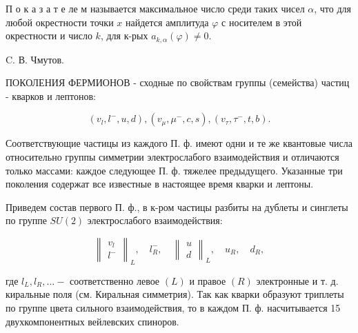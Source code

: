 \documentclass[10pt]{article}
\begin{document}
П о к а з а т е ле м называется максимальное число среди таких чисел $\alpha$, что для любой окрестности точки $x$ найдется амплитуда $\varphi$ с носителем в этой окрестности и число $k$, для к-рых $a_{k, \alpha}(\varphi) \neq 0$.



C. В. Чмутов.



ПОКОЛЕНИЯ ФЕРМИОНОВ - сходные по свойствам группы (семейства) частиц - кварков и лептонов:



\[

\left(v_{l}, l^{-}, u, d\right),\left(v_{\mu}, \mu^{-}, c, s\right),\left(v_{\tau}, \tau^{-}, t, b\right) .

\]



Соответствующие частицы из каждого П. ф. имеют одни и те же квантовые числа относительно группы симметрии электрослабого взаимодействия и отличаются только массами: каждое следующее П. ф. тяжелее предыдущего. Указанные три поколения содержат все известные в настоящее время кварки и лептоны.



Приведем состав первого П. ф., в к-ром частицы разбиты на дублеты и синглеты по группе $S U(2)$ электрослабого взаимодействия:



\[

\left\|\begin{array}{ll}

v_{l} \\

l^{-}

\end{array}\right\|_{L}, \quad l_{R}^{-}, \quad\left\|\begin{array}{l}

u \\

d

\end{array}\right\|_{L}, \quad u_{R}, \quad d_{R},

\]



где $l_{L}, l_{R}, \ldots-$ соответственно левое $(L)$ и правое $(R)$ электронные и т. д. киральные поля (см. Киральная симметрия). Так как кварки образуют триплеты по группе цвета сильного взаимодействия, то в каждом П. ф. насчитывается 15 двухкомпонентных вейлевских спиноров.
\end{document}
